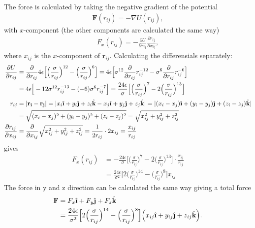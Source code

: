 \documentclass[11pt,a4wide]{article}
\renewcommand{\vec}{\mathbf}
\newcommand{\ihat}{\hat{\textbf{\i}}}
\newcommand{\jhat}{\hat{\textbf{\j}}}
\newcommand{\khat}{\hat{\textbf{k}}}
\begin{document}
The force is calculated by taking the negative gradient of the potential
\begin{align}
	\vec F(r_{ij}) = -\nabla U(r_{ij}),
\end{align}
with $x$-component (the other components are calculated the same way)
\begin{align}
	F_x(r_{ij}) = -\frac{\partial U}{\partial r_{ij}}\frac{\partial r_{ij}}{\partial x_{ij}},
\end{align}
where $x_{ij}$ is the $x$-component of $\vec r_{ij}$. Calculating the differensials separately:
\begin{align*}
\frac{\partial U}{\partial r_{ij}} &= \frac{\partial }{\partial r_{ij}} 4\epsilon\Big[\Big(\frac{\sigma}{r_{ij}}\Big)^{12} - \Big(\frac{\sigma}{r_{ij}}\Big)^6 \Big] =  4\epsilon\Big[ \sigma^{12}\frac{\partial }{\partial r_{ij}} r_{ij}^{-12} - \sigma^6 \frac{\partial }{\partial r_{ij}}r_{ij}^{-6} \Big] \\
&= 4\epsilon\Big[ -12\sigma^{12} r_{ij}^{-13} -(-6) \sigma^6 r_{ij}^{-7} \Big] = \frac{24\epsilon}{\sigma} \Big[\Big(\frac{\sigma}{r_{ij}}\Big)^{7} - 2\Big(\frac{\sigma}{r_{ij}}\Big)^{13} \Big] \\
r_{ij} &= |\vec{r_i} - \vec{r_j} | = | x_i\ihat + y_i\jhat + z_i\khat - x_j\ihat + y_j\jhat + z_j\khat | = | (x_i - x_j)\ihat + (y_i - y_j)\jhat + (z_i - z_j)\khat | \\
&= \sqrt{(x_i - x_j)^2 + (y_i - y_j)^2 + (z_i - z_j)^2} = \sqrt{x_{ij}^2 + y_{ij}^2 + z_{ij}^2} \\
\frac{\partial r_{ij}}{\partial x_{ij}} &= \frac{\partial}{\partial x_{ij}} \sqrt{x_{ij}^2 + y_{ij}^2 + z_{ij}^2} = \frac{1}{2r_{ij}}\cdot 2x_{ij} = \frac{x_{ij}}{r_{ij}}
\end{align*}
gives
\begin{align*}
F_x(r_{ij}) &= -\frac{24\epsilon}{\sigma} \Big[\Big(\frac{\sigma}{r_{ij}}\Big)^{7} - 2\Big(\frac{\sigma}{r_{ij}}\Big)^{13} \Big]\cdot \frac{x_{ij}}{r_{ij}} \\
&= \frac{24\epsilon}{\sigma^2} \Big[2\Big(\frac{\sigma}{r_{ij}}\Big)^{14} - \Big(\frac{\sigma}{r_{ij}}\Big)^{8} \Big]x_{ij}
\end{align*}
The force in y and z direction can be calculated the same way giving a total force
\begin{align*}
\vec F &= F_x\ihat + F_y \jhat + F_z\khat \\
&= \frac{24\epsilon}{\sigma^2} \Big[2\Big(\frac{\sigma}{r_{ij}}\Big)^{14} - \Big(\frac{\sigma}{r_{ij}}\Big)^{8} \Big]\Big(x_{ij}\ihat + y_{ij}\jhat + z_{ij}\khat \Big).
\end{align*}
\end{document}
